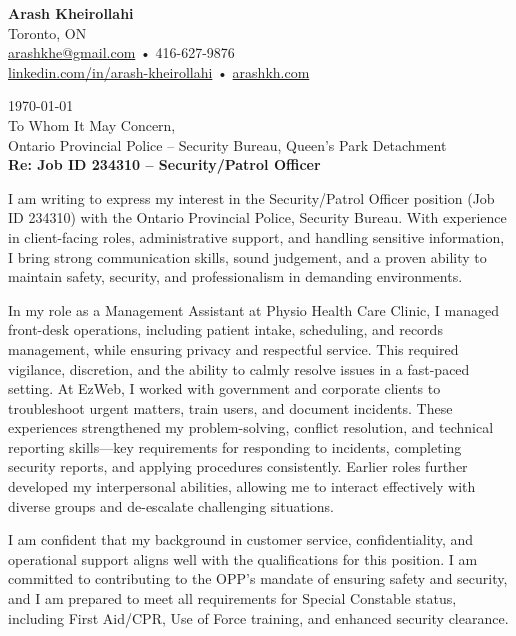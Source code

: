 \documentclass[letterpaper,10pt]{article}
\begin{document}

{\LARGE \textbf{Arash Kheirollahi}}\\[0.2em]
Toronto, ON \\
\href{mailto:arashkhe@gmail.com}{arashkhe@gmail.com} • 416-627-9876 \\
\href{https://linkedin.com/in/arash-kheirollahi}{linkedin.com/in/arash-kheirollahi} • \href{https://www.arashkh.com}{arashkh.com}

\vspace{1em}

\noindent\today \\[1em]

\noindent To Whom It May Concern, \\
Ontario Provincial Police – Security Bureau, Queen’s Park Detachment \\[0.5em]

\textbf{Re: Job ID 234310 – Security/Patrol Officer}

\vspace{1em}

I am writing to express my interest in the Security/Patrol Officer position (Job ID 234310) with the Ontario Provincial Police, Security Bureau. With experience in client-facing roles, administrative support, and handling sensitive information, I bring strong communication skills, sound judgement, and a proven ability to maintain safety, security, and professionalism in demanding environments.

In my role as a Management Assistant at Physio Health Care Clinic, I managed front-desk operations, including patient intake, scheduling, and records management, while ensuring privacy and respectful service. This required vigilance, discretion, and the ability to calmly resolve issues in a fast-paced setting. At EzWeb, I worked with government and corporate clients to troubleshoot urgent matters, train users, and document incidents. These experiences strengthened my problem-solving, conflict resolution, and technical reporting skills—key requirements for responding to incidents, completing security reports, and applying procedures consistently. Earlier roles further developed my interpersonal abilities, allowing me to interact effectively with diverse groups and de-escalate challenging situations.

I am confident that my background in customer service, confidentiality, and operational support aligns well with the qualifications for this position. I am committed to contributing to the OPP’s mandate of ensuring safety and security, and I am prepared to meet all requirements for Special Constable status, including First Aid/CPR, Use of Force training, and enhanced security clearance.
\end{document}
